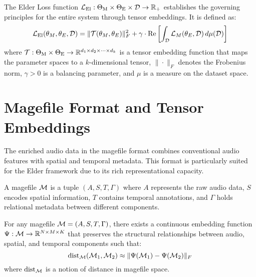 \begin{definition}
The Elder Loss function $\mathcal{L}_{\text{El}}: \Theta_{\text{M}} \times \Theta_{\text{E}} \times \mathcal{D} \rightarrow \mathbb{R}_+$ establishes the governing principles for the entire system through tensor embeddings. It is defined as:
\begin{equation}
\mathcal{L}_{\text{El}}(\theta_M, \theta_E, \mathcal{D}) = \| \mathcal{T}(\theta_M, \theta_E) \|_F^2 + \gamma \cdot \mathrm{Re}\left[\int_{\mathcal{D}} \mathcal{L}_M(\theta_E, \mathcal{D}) \, d\mu(\mathcal{D})\right]
\end{equation}
where $\mathcal{T}: \Theta_{\text{M}} \times \Theta_{\text{E}} \rightarrow \mathbb{R}^{d_1 \times d_2 \times \cdots \times d_k}$ is a tensor embedding function that maps the parameter spaces to a $k$-dimensional tensor, $\|\cdot\|_F$ denotes the Frobenius norm, $\gamma > 0$ is a balancing parameter, and $\mu$ is a measure on the dataset space.
\end{definition}

\section{Magefile Format and Tensor Embeddings}

The enriched audio data in the magefile format combines conventional audio features with spatial and temporal metadata. This format is particularly suited for the Elder framework due to its rich representational capacity.

\begin{definition}
A magefile $\mathcal{M}$ is a tuple $(A, S, T, \Gamma)$ where $A$ represents the raw audio data, $S$ encodes spatial information, $T$ contains temporal annotations, and $\Gamma$ holds relational metadata between different components.
\end{definition}

\begin{theorem}
For any magefile $\mathcal{M} = (A, S, T, \Gamma)$, there exists a continuous embedding function $\Psi: \mathcal{M} \rightarrow \mathbb{R}^{N \times M \times K}$ that preserves the structural relationships between audio, spatial, and temporal components such that:
\begin{equation}
\mathrm{dist}_{\mathcal{M}}(\mathcal{M}_1, \mathcal{M}_2) \approx \| \Psi(\mathcal{M}_1) - \Psi(\mathcal{M}_2) \|_F
\end{equation}
where $\mathrm{dist}_{\mathcal{M}}$ is a notion of distance in magefile space.
\end{theorem}

